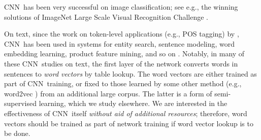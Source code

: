 \documentclass[11pt,letterpaper]{article}
\newcommand{\cnn}{CNN}
\begin{document}
\cnn\ has been very successful on image classification; see e.g., 
the winning solutions of ImageNet Large Scale Visual Recognition Challenge 
 \cite{imagenetNips12,Szegedy+etal14,Russakovsky+etal14}.  %

On text, 
since the work on token-level applications (e.g., POS tagging) by 
, 
\cnn\ has been used in systems for 
entity search,  %
sentence modeling, %
word embedding learning, %
product feature mining, %
and so on 
\cite{XS13,Gao+etal14,Shen+etal14,KGB14,XLLZ14,Tang+etal14,WCA14,Kim14}.  
Notably, in many of these \cnn\ studies on text, 
the first layer of the network converts words in sentences 
to {\em word vectors} by table lookup.  
The word vectors are either trained as part of \cnn\ training, or 
fixed to those learned by some other method 
(e.g., word2vec \cite{wvecNips13}) from an additional large corpus.  
The latter is a form of semi-supervised learning, which we study elsewhere. 
We are interested in the effectiveness of \cnn\ itself 
{\em without aid of additional resources}; therefore, 
word vectors should be trained as part of network training 
if word vector lookup is to be done.  
%
\end{document}

